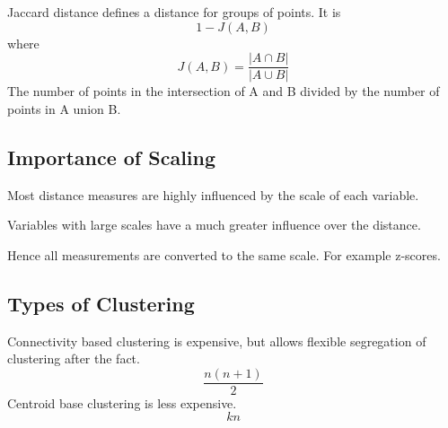 Jaccard distance defines a distance for groups of points.  It is
	\begin{equation}
		1 - J(A,B)
	\end{equation}
where
	\begin{equation}
		J(A,B) = \frac{\left|A\cap B\right|}{\left|A\cup B\right|}
	\end{equation}
The number of points in the intersection of A and B divided by the number of points in A union B.

	\subsection{Importance of Scaling}

	\begin{bulletedlist}
		\item Most distance measures are highly influenced by the scale of each variable.
		\item Variables with large scales have a much greater influence over the distance.
		\item Hence all measurements are converted to the same scale.  For example z-scores.
	\end{bulletedlist}

	\subsection{Types of Clustering}
Connectivity based clustering is expensive, but allows flexible segregation of clustering after the fact.
	\begin{displaymath}
		\frac{n(n+1)}{2}
	\end{displaymath}
Centroid base clustering is less expensive.
	\begin{displaymath}
		kn
	\end{displaymath}
	\begin{mathwhere}[0.38in]
	\end{mathwhere}

